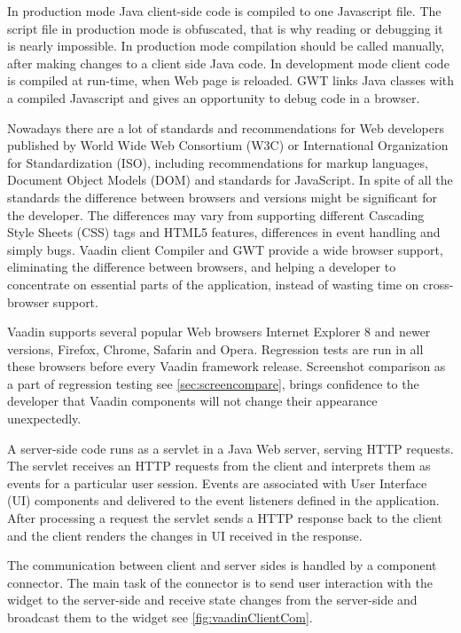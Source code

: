    In production mode Java  client-side code is compiled to one Javascript file. The script file in
   production mode is obfuscated, that is why reading or debugging it is nearly
   impossible. In production mode compilation should be called manually,
   after making changes to a client side Java code.
   In development mode client code is compiled at run-time, when Web page
   is reloaded. GWT links Java classes  with a compiled Javascript and gives
   an opportunity to debug code in a browser.
  
   Nowadays there are a lot of standards and recommendations for Web
   developers published by World Wide Web Consortium (W3C) or  International
   Organization for Standardization (ISO), including recommendations for
   markup languages, Document Object Models (DOM) and standards
   for JavaScript. In spite of all the standards the difference between browsers
   and versions might be significant for the developer. The differences may vary
   from supporting different Cascading Style Sheets (CSS) tags
   and HTML5 features, differences in event handling and simply bugs. Vaadin
   client Compiler and GWT provide a wide browser support, eliminating the difference between browsers, and helping a
   developer to concentrate on essential parts of the application, instead of
   wasting time on cross-browser support. 
   
   Vaadin supports several popular Web browsers Internet Explorer 8 and newer
   versions, Firefox, Chrome, Safarin and Opera. Regression tests are run
   in all these browsers before every Vaadin framework release. Screenshot
   comparison as a part of regression testing see \ref{sec:screencompare},
   brings confidence to the developer that Vaadin components will not change their appearance unexpectedly. 
   
   A server-side code runs as a servlet in a Java Web server, serving HTTP
   requests. The servlet receives an HTTP requests from the client and
   interprets them as events for a particular user session.
   Events are associated with User Interface (UI) components and delivered to
   the event listeners defined in the application. After processing a request
   the servlet sends a HTTP response back to the client and the client renders
   the changes in UI received in the response.
   
   The communication between client and server sides is handled by a component
   connector. The main task of the connector is to send user interaction
   with the widget to the server-side and receive state changes from the server-side 
   and broadcast them to the widget see \ref{fig:vaadinClientCom}. 
    

